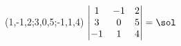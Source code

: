 \DETERMINANT(1,-1,2;3,0,5;-1,1,4){\sol}
\SpecialUsageIndex{\DETERMINANT}%
$\begin{vmatrix}
       1 & -1 & 2 \\ 3 & 0 & 5 \\ -1 & 1 & 4
     \end{vmatrix}=\sol$
